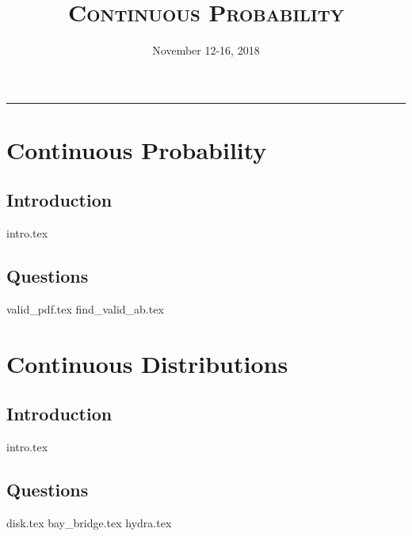 \documentclass{exam}
\title{\textsc{Continuous Probability}}
\date{November 12-16, 2018}
\begin{document}
\maketitle
\rule{\textwidth}{0.15em}
\fontsize{12}{15}\selectfont
\thispagestyle{empty}


\section{Continuous Probability}
\subsection{Introduction}
{intro.tex}
\subsection{Questions}
\begin{questions}
    {valid_pdf.tex}
    {find_valid_ab.tex}
\end{questions}

\section{Continuous Distributions}
\subsection{Introduction}
{intro.tex}
\subsection{Questions}
\begin{questions}
    {disk.tex}
    {bay_bridge.tex} 
    {hydra.tex}  
\end{questions} 
\end{document}
